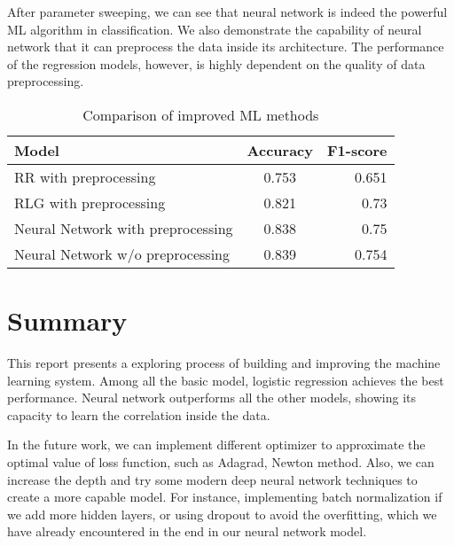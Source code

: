 \documentclass[10pt,conference,compsocconf]{IEEEtran}
\begin{document}
After parameter sweeping, we can see that neural network is indeed the powerful ML algorithm in classification. We also demonstrate the capability of neural network that it can preprocess the data inside its architecture. The performance of the regression models, however, is highly dependent on the quality of data preprocessing.


\begin{table}[h!]
  \begin{center}
    \caption{Comparison of improved ML methods}
    \label{tab:table1}
    \begin{tabular}{l|c|r}
      \textbf{Model} & \textbf{Accuracy} & \textbf{F1-score}\\
      \hline
      RR with preprocessing & 0.753 & 0.651\\
      RLG with preprocessing & 0.821 & 0.73\\
      Neural Network with preprocessing & 0.838 & 0.75\\
      Neural Network w/o preprocessing & 0.839 & 0.754\\
    \end{tabular}
  \end{center}
\end{table}

\section{Summary}

This report presents a exploring process of building and improving the machine learning system. Among all the basic model, logistic regression achieves the best performance. Neural network outperforms all the other models, showing its capacity to learn the
correlation inside the data.

In the future work, we can implement different optimizer to approximate the optimal value of loss function, such as Adagrad, Newton method. Also, we can increase the depth and try some modern deep neural network techniques to create a more capable model. For instance, implementing batch normalization if we add more hidden layers, or using dropout to avoid the overfitting, which we have already encountered in the end in our neural network model.
\end{document}
